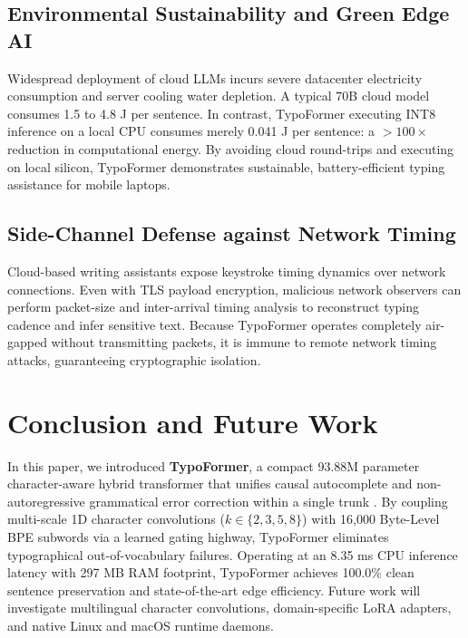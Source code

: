 \documentclass[10pt,journal,compsoc]{IEEEtran}
\begin{document}
\subsection{Environmental Sustainability and Green Edge AI}
Widespread deployment of cloud LLMs incurs severe datacenter electricity consumption and server cooling water depletion. A typical 70B cloud model consumes 1.5 to 4.8 J per sentence. In contrast, TypoFormer executing INT8 inference on a local CPU consumes merely 0.041 J per sentence: a $>100\times$ reduction in computational energy. By avoiding cloud round-trips and executing on local silicon, TypoFormer demonstrates sustainable, battery-efficient typing assistance for mobile laptops.

\subsection{Side-Channel Defense against Network Timing}
Cloud-based writing assistants expose keystroke timing dynamics over network connections. Even with TLS payload encryption, malicious network observers can perform packet-size and inter-arrival timing analysis to reconstruct typing cadence and infer sensitive text. Because TypoFormer operates completely air-gapped without transmitting packets, it is immune to remote network timing attacks, guaranteeing cryptographic isolation.

\section{Conclusion and Future Work}
\label{sec:conclusion}
In this paper, we introduced \textbf{TypoFormer}, a compact 93.88M parameter character-aware hybrid transformer that unifies causal autocomplete and non-autoregressive grammatical error correction within a single trunk \cite{mridul2026typoformer}. By coupling multi-scale 1D character convolutions ($k \in \{2, 3, 5, 8\}$) with 16,000 Byte-Level BPE subwords via a learned gating highway, TypoFormer eliminates typographical out-of-vocabulary failures. Operating at an 8.35 ms CPU inference latency with 297 MB RAM footprint, TypoFormer achieves 100.0\% clean sentence preservation and state-of-the-art edge efficiency. Future work will investigate multilingual character convolutions, domain-specific LoRA adapters, and native Linux and macOS runtime daemons.
\end{document}
